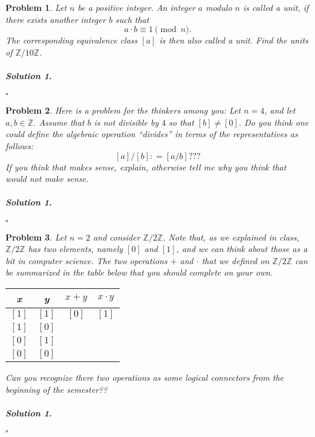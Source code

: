 \documentclass{amsart}
\theoremstyle{plain}
\newtheorem{problem}{Problem}
\newenvironment{solution}{\paragraph{\emph{Solution 1}.}}{\hfill$\square$}
\begin{document}
\begin{problem}
Let $n$ be a positive integer.  An integer $a$ modulo $n$ is called a unit, if there exists another integer $b$ such that
$$a \cdot b \equiv 1 \pmod{n}. $$
The corresponding equivalence class $[a]$ is then also called a unit.  Find the units of $\mathbb{Z}/10\mathbb{Z}$.
\end{problem}
\begin{solution}
\end{solution}


\begin{problem}
Here is a problem for the thinkers among you:  Let $n = 4$, and let $a,b \in \mathbb{Z}$.  Assume that $b$ is not divisible by $4$ so that $[b] \neq [0]$.  Do you think one could define the algebraic operation ``divides'' in terms of the representatives as follows:
$$[a]/[b] : = [a/b]??? $$
If you think that makes sense, explain, otherwise tell me why you think that would not make sense.
\end{problem}
\begin{solution}
\end{solution}


\begin{problem}
Let $n = 2$ and consider $\mathbb{Z}/2\mathbb{Z}$.  Note that, as we explained in class,  $\mathbb{Z}/2\mathbb{Z}$ has two elements, namely $[0]$ and $[1]$, and we can think about those as a bit in computer science.  The two operations $+$ and $\cdot$ that we defined on $\mathbb{Z}/2\mathbb{Z}$ can be summarized in the table below that you should complete on your own.
\begin{center}
\begin{tabular}{c|c|c|c}
x & y & $x + y$ & $x \cdot y$  \\
\hline
$ [1]$ & $[1]$ & $[0]$ & $[1]$ \\
 $[1] $& $[0]$ & & \\
$ [0]$ & $[1]$ & & \\
 $[0]$ & $[0]$ & &
\end{tabular}
\end{center}
Can you recognize there two operations as some logical connectors from the beginning of the semester??
\end{problem}
\begin{solution}
\end{solution}
\end{document}
